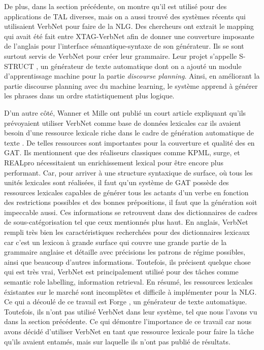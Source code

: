 De plus, dans la section précédente, on montre qu'il est utilisé pour des applications de TAL diverses, mais on a aussi trouvé des systèmes récents qui utilisaient VerbNet pour faire de la NLG. Des chercheurs ont extrait le mapping qui avait été fait entre XTAG-VerbNet afin de donner une couverture imposante de l'anglais pour l'interface sémantique-syntaxe de son générateur. Ils se sont surtout servis de VerbNet pour créer leur grammaire. Leur projet s'appelle S-STRUCT \citep{PfeilAlgorithmsResourcesScalable2016}, un générateur de texte automatique dont on a ajouté un module d'apprentissage machine pour la partie \emph{discourse planning}. Ainsi, en améliorant la partie discourse planning avec du machine learning, le système apprend à générer les phrases dans un ordre statistiquement plus logique.

D'un autre côté, Wanner et Mille ont publié un court article expliquant qu'ils prévoyaient utiliser VerbNet comme base de données lexicales car ils avaient besoin d'une ressource lexicale riche dans le cadre de génération automatique de texte \citep{MilleLargeCoverageDetailed2015}. De telles ressources sont importantes pour la couverture et qualité des en GAT. Ils mentionnent que des réaliseurs classiques comme KPML, surge, et REALpro  nécessitaient un enrichissement lexical pour être encore plus performant. Car, pour arriver à une structure syntaxique de surface, où tous les unités lexicales sont réalisées, il faut qu'un système de GAT possède des ressources lexicales capables de générer tous les actants d'un verbe en fonction des restrictions possibles et des bonnes prépositions, il faut que la génération soit impeccable aussi. Ces informations se retrouvent dans des dictionnaires de cadres de sous-catégorisation tel que ceux mentionnés plus haut. En anglais, VerbNet rempli très bien les caractéristiques recherchées pour des dictionnaires lexicaux car c'est un lexicon à grande surface qui couvre une grande partie de la grammaire anglaise et détaille avec précisions les patrons de régime possibles, ainsi que beaucoup d'autres informations. Toutefois, ils précisent quelque chose qui est très vrai, VerbNet est principalement utilisé pour des tâches comme semantic role labelling, information retrieval. En résumé, les ressources lexicales éxistantes sur le marché sont incomplètes et difficile à implémenter pour la NLG. Ce qui a découlé de ce travail est Forge \citep{DBLP:conf/semeval/MilleCBW17}, un générateur de texte automatique. Toutefois, ils n'ont pas utilisé VerbNet dans leur système, tel que nous l'avons vu dans la section précédente. Ce qui démontre l'importance de ce travail car nous avons décidé d'utiliser VerbNet en tant que ressource lexicale pour faire la tâche qu'ils avaient entamés, mais sur laquelle ils n'ont pas publié de résultats.

